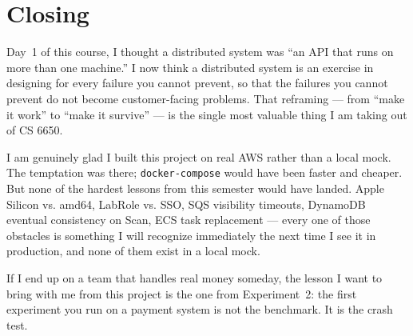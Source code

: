 \documentclass[11pt,a4paper]{article}
\begin{document}
\section*{Closing}

Day~1 of this course, I thought a distributed system was ``an API that runs on more than one machine.'' I now think a distributed system is an exercise in designing for every failure you cannot prevent, so that the failures you cannot prevent do not become customer-facing problems. That reframing --- from ``make it work'' to ``make it survive'' --- is the single most valuable thing I am taking out of CS 6650.

I am genuinely glad I built this project on real AWS rather than a local mock. The temptation was there; \texttt{docker-compose} would have been faster and cheaper. But none of the hardest lessons from this semester would have landed. Apple Silicon vs. amd64, LabRole vs. SSO, SQS visibility timeouts, DynamoDB eventual consistency on Scan, ECS task replacement --- every one of those obstacles is something I will recognize immediately the next time I see it in production, and none of them exist in a local mock.

\begin{openingbox}
If I end up on a team that handles real money someday, the lesson I want to bring with me from this project is the one from Experiment~2: the first experiment you run on a payment system is not the benchmark. It is the crash test.
\end{openingbox}
\end{document}
